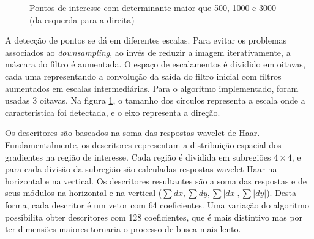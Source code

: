 \documentclass[a4paper]{coursepaper-br}
\begin{document}
\begin{figure}
 \centering
 \caption{Pontos de interesse com determinante maior que 500, 1000 e
   3000 (da esquerda para a direita)}
 \label{fig:hessian}
\end{figure}

A detecção de pontos se dá em diferentes escalas. Para evitar os
problemas associados ao \emph{downsampling}, ao invés de reduzir a
imagem iterativamente, a máscara do filtro é aumentada. O espaço de
escalamentos é dividido em oitavas, cada uma representando a
convolução da saída do filtro inicial com filtros aumentados em
escalas intermediárias. Para o algoritmo implementado, foram usadas 3
oitavas. Na figura \ref{fig:hessian}, o tamanho dos círculos
representa a escala onde a característica foi detectada, e o eixo
representa a direção.

Os descritores são baseados na soma das respostas wavelet de
Haar. Fundamentalmente, os descritores representam a distribuição
espacial dos gradientes na região de interesse. Cada região é dividida
em subregiões $4 \times 4$, e para cada divisão da subregião são calculadas
respostas wavelet Haar na horizontal e na vertical. Os descritores
resultantes são a soma das respostas e de seus módulos na horizontal e
na vertical ($\sum dx, \sum dy, \sum |dx|, \sum |dy|$). Desta forma,
cada descritor é um vetor com 64 coeficientes. Uma variação do
algoritmo possibilita obter descritores com 128 coeficientes, que é
mais distintivo mas por ter dimensões maiores tornaria o processo de
busca mais lento.
\end{document}
